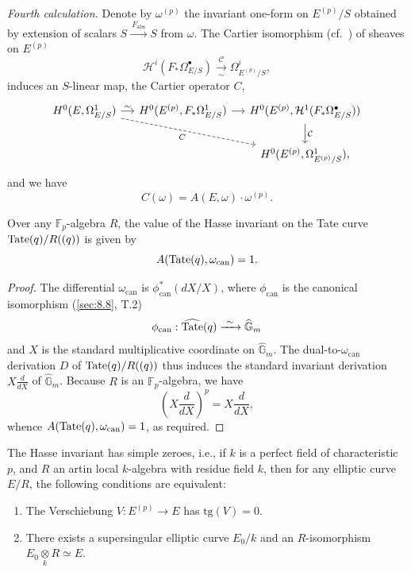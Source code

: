 \kmitem\label{item:12.4.1.4}
\emph{Fourth calculation.} Denote by $\omega^{(p)}$ the invariant one-form on $E^{(p)}/S$ obtained by extension of scalars $S \xrightarrow{\ F_{\mathrm{abs}}\ } S$ from $\omega$. The Cartier isomorphism (cf.~\cite{K1}) of sheaves on $E^{(p)}$
\[
\mathcal{H}^i(F_*\Omega^{\bullet}_{E/S}) \xrightarrow[\sim]{\ \mathcal{C}\ } \Omega^i_{E^{(p)}/S} ,
\]
induces an $S$-linear map, the Cartier operator $C$,
\[
\begin{tikzcd}[row sep=1.8em, column sep=small]
H^0(E,\Omega^1_{E/S}) \arrow[r, "\sim"] \arrow[drr, dashed, "C"'] & H^0(E^{(p)}, F_*\Omega^1_{E/S}) \arrow[r] & H^0(E^{(p)}, \mathcal{H}^1(F_*\Omega^{\bullet}_{E/S})) \arrow[d, "\mathcal{C}"] \\
& & H^0(E^{(p)}, \Omega^1_{E^{(p)}/S}) ,
\end{tikzcd}
\]
and we have
\[
C(\omega) = A(E,\omega) \cdot \omega^{(p)} .
\]

\begin{kthm}\label{thm:12.4.2}
Over any $\mathbb{F}_p$-algebra $R$, the value of the Hasse invariant on the Tate curve $\mathrm{Tate}(q)/R((q))$ is given by
\[
A(\mathrm{Tate}(q), \omega_{\mathrm{can}}) = 1 .
\]
\end{kthm}

\begin{proof}
The differential $\omega_{\mathrm{can}}$ is $\phi_{\mathrm{can}}^*(dX/X)$, where $\phi_{\mathrm{can}}$ is the canonical isomorphism (\ref{sec:8.8}, T.2)
\[
\phi_{\mathrm{can}} : \widehat{\mathrm{Tate}}(q) \xrightarrow{\ \sim\ } \widehat{\mathbb{G}}_m
\]
and $X$ is the standard multiplicative coordinate on $\widehat{\mathbb{G}}_m$. The dual-to-$\omega_{\mathrm{can}}$ derivation $D$ of $\mathrm{Tate}(q)/R((q))$ thus induces the standard invariant derivation $X\frac{d}{dX}$ of $\widehat{\mathbb{G}}_m$. Because $R$ is an $\mathbb{F}_p$-algebra, we have
\[
\left(X\frac{d}{dX}\right)^p = X\frac{d}{dX} ,
\]
whence $A(\mathrm{Tate}(q), \omega_{\mathrm{can}}) = 1$, as required.
\end{proof}

\begin{kthm}[Igusa]\label{thm:12.4.3}
The Hasse invariant has simple zeroes, i.e., if $k$ is a perfect field of characteristic $p$, and $R$ an artin local $k$-algebra with residue field $k$, then for any elliptic curve $E/R$, the following conditions are equivalent:
\begin{enumerate}[label=(\arabic*)]
\item The Verschiebung $V : E^{(p)} \to E$ has $\mathrm{tg}(V) = 0$.
\item There exists a supersingular elliptic curve $E_0/k$ and an $R$-isomorphism $E_0 \underset{k}{\otimes} R \simeq E$.
\end{enumerate}
\end{kthm}

